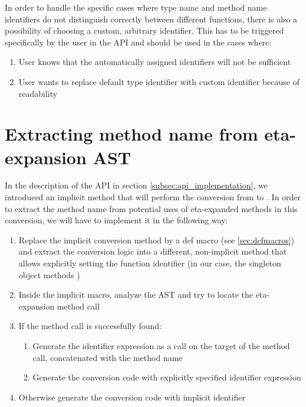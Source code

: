 In order to handle the specific cases where type name and method name identifiers do not distinguish correctly between different functions, there is also a possibility of choosing a custom, arbitrary identifier. This has to be triggered specifically by the user in the API and should be used in the cases where:

\begin{enumerate}
	\item User knows that the automatically assigned identifiers will not be sufficient
	\item User wants to replace default type identifier with custom identifier because of readability
\end{enumerate}

\section{Extracting method name from eta-expansion AST}

In the description of the API in section \ref{subsec:api_implementation}, we introduced an implicit method that will perform the conversion from  to . In order to extract the method name from potential uses of eta-expanded methods in this conversion, we will have to implement it in the following way:

\begin{enumerate}
	\item Replace the implicit conversion method by a def macro (see \ref{sec:defmacros}) and extract the conversion logic into a different, non-implicit method that allows explicitly setting the function identifier (in our case, the  singleton object methods )
	\item Inside the implicit macro, analyze the AST and try to locate the eta-expansion method call
	\item If the method call is successfully found:
	\begin{enumerate}
		\item Generate the identifier expression as a  call on the target of the method call, concatenated with the method name
		\item Generate the conversion code with explicitly specified identifier expression
	\end{enumerate}
	\item Otherwise generate the conversion code with implicit identifier	
\end{enumerate}

